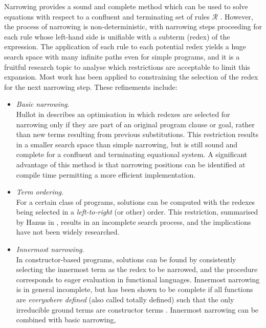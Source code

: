 Narrowing provides a sound and complete method which can be used to solve
equations with respect to a confluent and terminating set of rules
$\mathcal{R}$ \cite{Hul80}.  However, the process of narrowing
is non-deterministic, with narrowing steps proceeding
for each rule whose left-hand side is unifiable with a subterm (redex)
of the expression.  The application of each rule to each potential redex
yields a huge search space with many infinite paths even for simple
programs, and it is a fruitful research topic to analyse which 
restrictions are acceptable to limit this expansion.  Most work has been
applied to constraining the selection of the redex for the
next narrowing step.  These refinements include:
\enlargethispage{\baselineskip}  %
\begin{itemize}
\item{\textit{Basic narrowing}.\\
  Hullot in \cite{Hul80} describes an optimisation in which
  redexes are selected for narrowing only if they are part of an original
  program clause or goal, rather than new terms resulting from previous
  substitutions.  This restriction results in a smaller search space than
  simple narrowing, but is still sound and complete for a confluent and
  terminating equational system.  A significant advantage of this method is
  that narrowing positions can be identified at compile time permitting a
  more efficient implementation.
  }
\item{\textit{Term ordering}.\\
  For a certain class of programs, solutions can be computed with the redexes
  being selected in a \textit{left-to-right} (or other) order.
  This restriction, summarised by Hanus in \cite{Han94},
  results in an incomplete search process, and the implications
  have not been widely researched.
  }
\item{\textit{Innermost narrowing}.\\
  In constructor-based programs, solutions can be found by consistently
  selecting the innermost term as the redex to be narrowed,  and the
  procedure corresponds to eager evaluation in functional languages.
  Innermost narrowing is in general incomplete, but has been shown to be
  complete if all functions are \textit{everywhere defined} (also called
  totally defined) such that the only irreducible ground terms are constructor
  terms \cite{Fri85}.  Innermost narrowing can be combined with basic narrowing,
}
\end{itemize}
